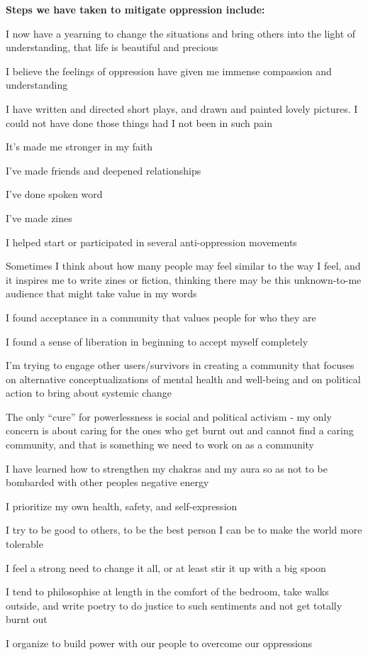 \noindent\textcolor{ProcessBlue}{\textbf{\LARGE{Steps we have taken to mitigate oppression include:}}}\\

\begin{multicols}{2}
	\begin{checkboxlist}
		\item I now have a yearning to change the situations and bring others into the light of understanding, that life is beautiful and precious	
		\item I believe the feelings of oppression have given me immense compassion and understanding
		\item I have written and directed short plays, and drawn and painted lovely pictures. I could not have done those things had I not been in such pain
		\item It’s made me stronger in my faith
		\item I’ve made friends and deepened relationships
		\item I’ve done spoken word
		\item I’ve made zines
		\item I helped start or participated in several anti-oppression movements
		\item Sometimes I think about how many people may feel similar to the way I feel, and it inspires me to write zines or fiction, thinking there may be this unknown-to-me audience that might take value in my words
		\item I found acceptance in a community that values people for who they are
		\item I found a sense of liberation in beginning to accept myself completely
		\item I’m trying to engage other users/survivors in creating a community that focuses on alternative conceptualizations of mental health and well-being and on political action to bring about systemic change
		\item The only “cure” for powerlessness is social and political activism - my only concern is about caring for the ones who get burnt out and cannot find a caring community, and that is something we need to work on as a community
		\item I have learned how to strengthen my chakras and my aura so as not to be bombarded with other peoples negative energy		
		\item I prioritize my own health, safety, and self-expression
		\item I try to be good to others, to be the best person I can be to make the world more tolerable
		\item I feel a strong need to change it all, or at least stir it up with a big spoon
		\item I tend to philosophise at length in the comfort of the bedroom, take walks outside, and write poetry to do justice to such sentiments and not get totally burnt out
		\item I organize to build power with our people to overcome our oppressions
	\end{checkboxlist}
\end{multicols}

